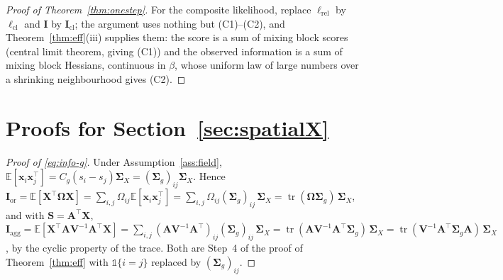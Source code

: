 \documentclass[11pt]{article}
\theoremstyle{definition}
\newcommand{\bX}{\mathbf{X}}
\newcommand{\bx}{\bm{x}}\newcommand{\bg}{\bm{g}}\newcommand{\bw}{\bm{w}}\newcommand{\bz}{\bm{z}}
\newcommand{\bV}{\mathbf{V}}
\newcommand{\bSig}{\boldsymbol{\Sigma}}
\newcommand{\bOm}{\boldsymbol{\Omega}}
\newcommand{\E}{\mathbb{E}}
\newcommand{\tr}{\operatorname{tr}}
\newcommand{\rel}{\mathrm{rel}}
\newcommand{\agg}{\mathrm{agg}}
\newcommand{\orc}{\mathrm{or}}
\begin{document}
\begin{proof}[Proof of Theorem~\ref{thm:onestep}]
For the composite likelihood, replace $\ell_\rel$ by $\ell_{\mathrm{cl}}$ and $\mathbf I$ by $\mathbf I_{\mathrm{cl}}$; the argument uses nothing but (C1)--(C2), and Theorem~\ref{thm:eff}(iii) supplies them: the score is a sum of mixing block scores (central limit theorem, giving (C1)) and the observed information is a sum of mixing block Hessians, continuous in $\beta$, whose uniform law of large numbers over a shrinking neighbourhood gives (C2).
\end{proof}

\section{Proofs for Section~\ref{sec:spatialX}}\label{app:spatial}

\begin{proof}[Proof of \eqref{eq:info-g}]
Under Assumption~\ref{ass:field}, $\E[\bx_i\bx_j^\top]=C_g(s_i-s_j)\bSig_X=(\bSig_g)_{ij}\bSig_X$. Hence $\mathbf I_\orc=\E[\bX^\top\bOm\bX]=\sum_{i,j}\Omega_{ij}\E[\bx_i\bx_j^\top]=\sum_{i,j}\Omega_{ij}(\bSig_g)_{ij}\,\bSig_X=\tr(\bOm\bSig_g)\,\bSig_X$, and with $\mathbf S=\mathbf A^\top\bX$, $\mathbf I_\agg=\E[\bX^\top\mathbf A\bV^{-1}\mathbf A^\top\bX]=\sum_{i,j}(\mathbf A\bV^{-1}\mathbf A^\top)_{ij}(\bSig_g)_{ij}\,\bSig_X=\tr(\mathbf A\bV^{-1}\mathbf A^\top\bSig_g)\,\bSig_X=\tr(\bV^{-1}\mathbf A^\top\bSig_g\mathbf A)\,\bSig_X$, by the cyclic property of the trace. Both are Step~4 of the proof of Theorem~\ref{thm:eff} with $\mathbb 1\{i=j\}$ replaced by $(\bSig_g)_{ij}$.
\end{proof}
\end{document}
